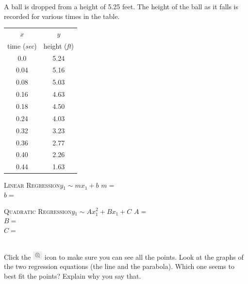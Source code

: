 \documentclass[12pt,letterpaper]{memoir}
\begin{document}
\myWideProblemWithContent 
{
    A ball is dropped from a height of 5.25 feet.
    The height of the ball as it falls is recorded 
    for various times in the table.\\[0.5em]
    \begin{minipage}{0.35\textwidth}
        \footnotesize
        \begin{tabular}{cc}
            $x$ & $y$ \\ 
            time ({\itshape sec}) & height ({\itshape ft}) \\
            \midrule 
            0.0   & 5.24 \\
            0.04  & 5.16 \\ 
            0.08  & 5.03 \\ 
            0.16  & 4.63 \\ 
            0.18  & 4.50 \\ 
            0.24  & 4.03 \\ 
            0.32  & 3.23 \\ 
            0.36  & 2.77 \\ 
            0.40  & 2.26 \\
            0.44  & 1.63 \\
            \bottomrule
        \end{tabular}
        \end{minipage}
    \begin{minipage}{0.64\textwidth}
        \begin{tcolorbox}[colback=white,width=\textwidth]
            \small
            \scshape{Linear Regression}\hfill$y_1 \sim m x_1 + b$
            \tcblower
            $m =$  \\
            $b =$ 
        \end{tcolorbox}
        \begin{tcolorbox}[colback=white,width=\textwidth]
            \small
            \scshape{Quadratic Regression}\hfill$y_1 \sim A x_1^2 + B x_1 + C$
            \tcblower
            $A =$  \\
            $B =$ \\
            $C =$ 
        \end{tcolorbox}
    \end{minipage}\\[1\onelineskip]
    Click the 
    \includegraphics[width=0.2in]{magnifying-glass-plus.png} 
    icon to make sure you can see all the points.
    Look at the graphs of the two regression equations 
    (the line and the parabola).
    Which one seems to best fit the points?
    Explain why you say that.
    \vspace{0.7in}
}
\end{document}
